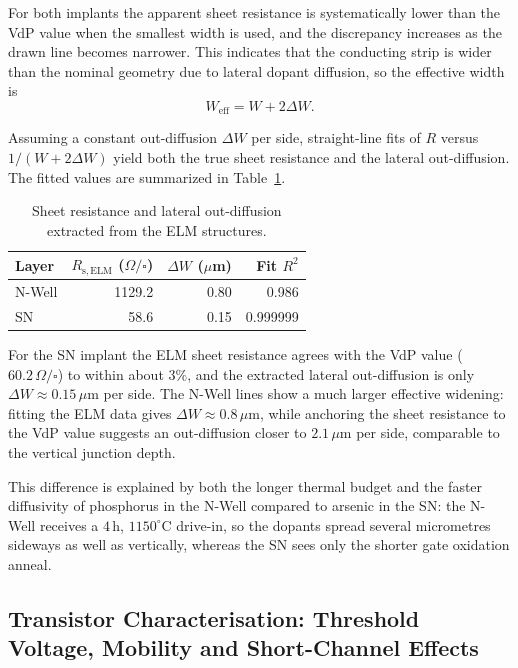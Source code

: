 For both implants the apparent sheet resistance is systematically lower than the VdP value when the smallest width is used, and the discrepancy increases as the drawn line becomes narrower. This indicates that the conducting strip is wider than the nominal geometry due to lateral dopant diffusion, so the effective width is
\[
  W_\mathrm{eff} = W + 2\Delta W.
\]

Assuming a constant out-diffusion $\Delta W$ per side, straight-line fits of $R$ versus $1/(W + 2\Delta W)$ yield both the true sheet resistance and the lateral out-diffusion. The fitted values are summarized in Table~\ref{tab:ch7-elm-fit}.

\begin{table}[htbp]
  \centering
  \caption{Sheet resistance and lateral out-diffusion extracted from the ELM structures.}
  \label{tab:ch7-elm-fit}
  \begin{tabular}{lrrr}
    \toprule
    Layer & $R_\mathrm{s,ELM}$ ($\Omega/\square$) & $\Delta W$ ($\mu$m) & Fit $R^2$ \\
    \midrule
    N-Well & 1129.2 & 0.80 & 0.986 \\
    SN     &   58.6 & 0.15 & 0.999999 \\
    \bottomrule
  \end{tabular}
\end{table}

For the SN implant the ELM sheet resistance agrees with the VdP value ($60.2\,\Omega/\square$) to within about $3\%$, and the extracted lateral out-diffusion is only $\Delta W \approx 0.15\,\mu\mathrm{m}$ per side. The N-Well lines show a much larger effective widening: fitting the ELM data gives $\Delta W \approx 0.8\,\mu\mathrm{m}$, while anchoring the sheet resistance to the VdP value suggests an out-diffusion closer to $2.1\,\mu\mathrm{m}$ per side, comparable to the vertical junction depth.

This difference is explained by both the longer thermal budget and the faster diffusivity of phosphorus in the N-Well compared to arsenic in the SN: the N-Well receives a $4$\,h, $1150^\circ$C drive-in, so the dopants spread several micrometres sideways as well as vertically, whereas the SN sees only the shorter gate oxidation anneal.

\subsection{Transistor Characterisation: Threshold Voltage, Mobility and Short-Channel Effects}

